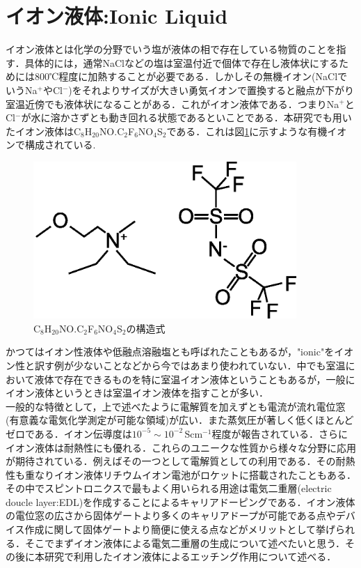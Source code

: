 \section{イオン液体:Ionic Liquid}
イオン液体とは化学の分野でいう塩が液体の相で存在している物質のことを指す．具体的には，通常NaClなどの塩は室温付近で個体で存在し液体状にするためには800℃程度に加熱することが必要である．しかしその無機イオン(NaClでいうNa$^{+}$やCl$^{-}$)をそれよりサイズが大きい勇気イオンで置換すると融点が下がり室温近傍でも液体状になることがある．これがイオン液体である．つまりNa$^{+}$とCl$^{-}$が水に溶かさずとも動き回れる状態であるといことである．本研究でも用いたイオン液体はC$_{8}$H$_{20}$NO.C$_{2}$F$_{6}$NO$_{4}$S$_{2}$である．これは図\ref{IL}に示すような有機イオンで構成されている.
\begin{figure}[!h]
 \begin{center}
  \includegraphics[width=100mm]{images/IL.eps}
\end{center}
 \caption{C$_{8}$H$_{20}$NO.C$_{2}$F$_{6}$NO$_{4}$S$_{2}$の構造式}
 \label{IL}
\end{figure}

かつてはイオン性液体や低融点溶融塩とも呼ばれたこともあるが，"ionic"をイオン性と訳す例が少ないことなどから今ではあまり使われていない．中でも室温において液体で存在できるものを特に室温イオン液体ということもあるが，一般にイオン液体というときは室温イオン液体を指すことが多い．\\


一般的な特徴として，上で述べたように電解質を加えずとも電流が流れ電位窓(有意義な電気化学測定が可能な領域)が広い．また蒸気圧が著しく低くほとんどゼロである．イオン伝導度は$10^{-5}\sim10^{-2}\,\mathrm{Scm^{-1}}$程度が報告されている．さらにイオン液体は耐熱性にも優れる．これらのユニークな性質から様々な分野に応用が期待されている．例えばその一つとして電解質としての利用である．その耐熱性も重なりイオン液体リチウムイオン電池がロケットに搭載されたこともある．その中でスピントロニクスで最もよく用いられる用途は電気二重層(electric doucle layer:EDL)を作成することによるキャリアドーピングである．イオン液体の電位窓の広さから固体ゲートより多くのキャリアドープが可能である点やデバイス作成に関して固体ゲートより簡便に使える点などがメリットとして挙げられる．そこでまずイオン液体による電気二重層の生成について述べたいと思う．その後に本研究で利用したイオン液体によるエッチング作用について述べる．

